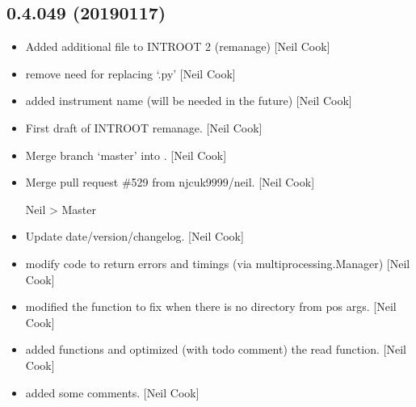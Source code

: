 \documentclass[a4paper,10pt,english]{report}
\begin{document}
\subsection{0.4.049 (2019\sphinxhyphen{}01\sphinxhyphen{}17)}
\label{\detokenize{misc/changelog:id233}}\begin{itemize}
\item {} 
Added additional file to INTROOT 2 (remanage) {[}Neil Cook{]}

\item {} 
 \sphinxhyphen{} remove need for replacing ‘.py’ {[}Neil Cook{]}

\item {} 
 \sphinxhyphen{} added instrument name (will be needed in the
future) {[}Neil Cook{]}

\item {} 
First draft of INTROOT remanage. {[}Neil Cook{]}

\item {} 
Merge branch ‘master’ into . {[}Neil Cook{]}

\item {} 
Merge pull request \#529 from njcuk9999/neil. {[}Neil Cook{]}

Neil \textendash{}\textgreater{} Master

\item {} 
Update date/version/changelog. {[}Neil Cook{]}

\item {} 
 \sphinxhyphen{} modify code to return errors and timings (via
multiprocessing.Manager) {[}Neil Cook{]}

\item {} 
 \sphinxhyphen{} modified the  function to
fix when there is no directory from pos args. {[}Neil Cook{]}

\item {} 
 \sphinxhyphen{} added  functions and optimized
(with todo comment) the read function. {[}Neil Cook{]}

\item {} 
 \sphinxhyphen{} added some comments. {[}Neil Cook{]}

\end{itemize}
\end{document}
